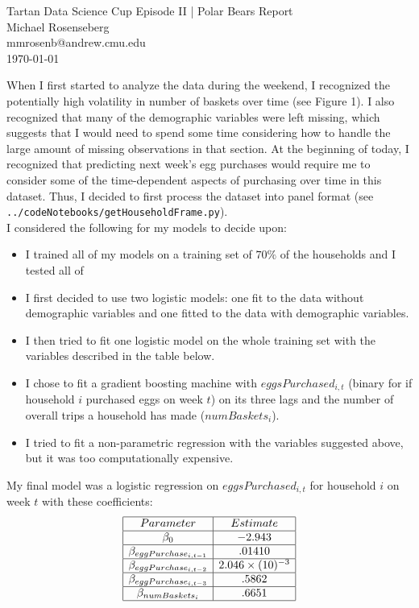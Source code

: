\documentclass[11pt]{article}
\makeatletter
\newcommand{\myname}{Michael Rosenseberg}
\newcommand{\myandrew}{mmrosenb@andrew.cmu.edu}
\newcommand{\mycourse}{Tartan Data Science Cup Episode II}
\newcommand{\myhwname}{| Polar Bears Report}
\newcommand{\myteammates}{}
\makeatother
\begin{document}
\begin{center}
    {\Large \mycourse} {\Large \myhwname} \\
    \myname \\
    \myandrew \\
    \today \\
\end{center}

When I first started to analyze the data during the weekend, I recognized the
potentially high volatility in number of baskets over time (see Figure 1). I
also recognized that many of the demographic variables were left missing,
which suggests that I would need to spend some time considering how to handle
the large amount of missing observations in that section. At the beginning of
today, I recognized that predicting next week's egg purchases would require
me to consider some of the time-dependent aspects of purchasing over time in
this dataset. Thus, I decided to first process the dataset into panel
format (see \verb|../codeNotebooks/getHouseholdFrame.py|). \\

I considered the following for my models to decide upon:
\begin{itemize}
    \item I trained all of my models on a training set of $70\%$ of the 
        households
        and I tested all of 
    \item I first decided to use two logistic models: one fit to the data
        without demographic variables and one fitted to  the data with
        demographic variables.
    \item I then tried to fit one logistic model on the whole training set
        with the variables described in the table below.
    \item I chose to fit a gradient boosting machine with $eggsPurchased_{i,t}$
        (binary for if household $i$ purchased eggs on week $t$) on its three
        lags and the number of overall trips a household has made
        ($numBaskets_i$).
    \item I tried to fit a non-parametric regression with the variables
        suggested above, but it was too computationally expensive.
\end{itemize}

My final model was a logistic regression on $eggsPurchased_{i,t}$ for household
$i$ on week $t$ with these coefficients:
$$\begin{array}{|c|c|}
    \hline
    Parameter&Estimate \\
    \hline
    \beta_{0}&-2.943 \\
    \hline
    \beta_{eggPurchase_{i,t-1}}&.01410 \\
    \hline
    \beta_{eggPurchase_{i,t-2}}&2.046 \times (10)^{-3} \\
    \hline
    \beta_{eggPurchase_{i,t-3}}&.5862 \\
    \hline
    \beta_{numBaskets_{i}}&.6651 \\
    \hline
\end{array}$$
\end{document}

